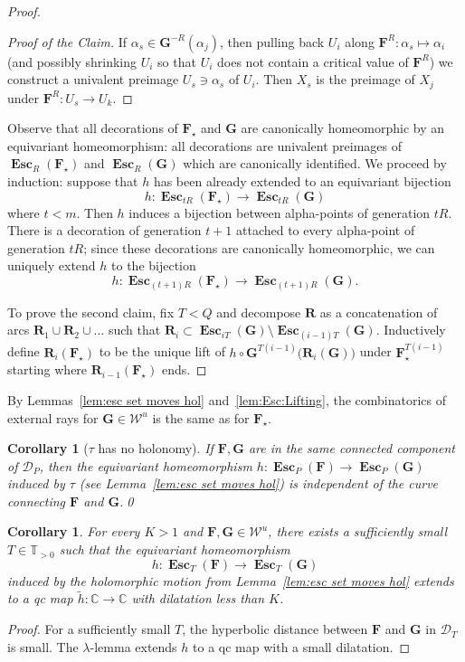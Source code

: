 \documentclass{amsart}
\newcommand{\1}{{\mathbb 1 }}
\newcommand\PT{\mathbb{ T}}
\newcommand{\bF}{{\mathbf F}}
\newcommand{\bR}{{\mathbf R}}
\newcommand{\bG}{{\mathbf G}}
\newcommand{\str}{{\star}}
\newcommand\Unst{{\boldsymbol{\mathcal{W}}^u}}
\newcommand{\C}{\mathbb{C}}
\newtheorem{cor}[thm]{Corollary}
\theoremstyle{remark}
\numberwithin{equation}{section}
\theoremstyle{definition}
\newcommand{\Esc}{{\boldsymbol{\operatorname{Esc}}}}
\newcommand{\DEsc}{{\boldsymbol{\mathcal D}}}
\theoremstyle{nonumberbreak}
\begin{document}
\begin{proof}
\begin{proof}[Proof of the Claim]
If $\alpha_s\in \bG^{-R}(\alpha_j)$, then pulling back $U_i$ along $\bF^R\colon \alpha_s\mapsto \alpha_i$  (and possibly shrinking $U_i$ so that $U_i$ does not contain a critical value of $\bF^R$) we construct a univalent preimage $U_s\ni \alpha_s$ of $U_i$. Then $X_s$ is the preimage of $X_j$ under $\bF^{R}\colon U_s\to U_k$.
\end{proof}

Observe that all decorations of $\bF_\str$ and $\bG$ are canonically homeomorphic by an equivariant homeomorphism: all decorations are univalent preimages of $\Esc_R(\bF_\str)$ and  $\Esc_R(\bG)$ which are canonically identified. We proceed by induction: suppose that $h$ has been already extended to an equivariant bijection
\[h\colon \Esc_{t R}(\bF_\str)\to  \Esc_{t R}(\bG)\]
where $t<m$. Then $h$ induces a bijection between alpha-points of generation $tR$. There is a decoration of generation $t+1$ attached to every alpha-point of generation $tR$; since these decorations are canonically homeomorphic, we can uniquely extend $h$ to the bijection 
\[h\colon \Esc_{(t+1) R}(\bF_\str)\to  \Esc_{(t+1) R}(\bG).\]


To prove the second claim, fix $T<Q$ and decompose $\bR$ as a concatenation of arcs $\bR_1\cup \bR_2\cup \dots$ such that $\bR_i\subset  \Esc_{iT}(\bG)\setminus \Esc_{(i-1)T}(\bG)$. Inductively define $\bR_i(\bF_\str)$ to be the unique lift of $h \circ \bG^{T(i-1)} \big( \bR_i(\bG)\big) $ under $\bF_\str^{T(i-1)}$ starting where $\bR_{i-1}(\bF_\str)$ ends.
 \end{proof}
 
By Lemmas~\ref{lem:esc set moves hol} and~\ref{lem:Esc:Lifting}, the combinatorics of external rays for $\bG\in \Unst$ is the same as for $\bF_\str$.

\begin{cor}[$\tau$ has no holonomy]
If $\bF,\bG$ are in the same connected component of $\DEsc_P$, then the equivariant homeomorphism $h\colon \Esc_P(\bF)\to \Esc_{P}(\bG)$ induced by $\tau$ (see Lemma~\ref{lem:esc set moves hol}) is independent of the curve connecting $\bF$ and $\bG$.\qed
\end{cor}


\begin{cor}
For every $K>1$ and $\bF,\bG\in \Unst$, there exists a sufficiently small $T\in \PT_{>0}$ such that the equivariant homeomorphism 
\[h\colon \Esc_T(\bF)\to \Esc_T(\bG)\]
induced by the holomorphic motion from Lemma~\ref{lem:esc set moves hol}
extends to a qc map $\widetilde h\colon \C\to \C$ with dilatation less than $K$. 
\end{cor}
\begin{proof}
For a sufficiently small $T$, the hyperbolic distance between $\bF$ and $\bG$ in $\DEsc_T$ is small. The $\lambda$-lemma extends $h$ to a qc map with a small dilatation. 
\end{proof}
\end{document}
